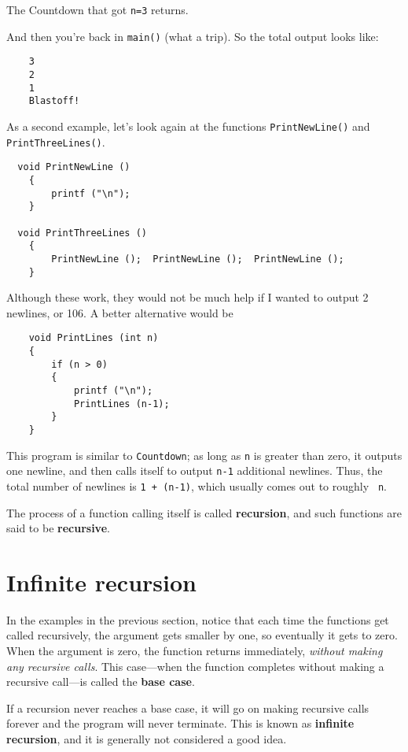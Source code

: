 The Countdown that got {\tt n=3} returns.

\noindent And then you're back in {\tt main()} (what a trip).  So the
total output looks like:

\begin{verbatim}
    3
    2
    1
    Blastoff!
\end{verbatim}
%
As a second example, let's look again at the functions
{\tt PrintNewLine()} and {\tt PrintThreeLines()}.

\begin{verbatim}
  void PrintNewLine () 
    {
        printf ("\n");
    }

  void PrintThreeLines () 
    {
        PrintNewLine ();  PrintNewLine ();  PrintNewLine ();
    }
\end{verbatim}
%
Although these work, they would not be much help if I wanted
to output 2 newlines, or 106.  A better alternative would be

\begin{verbatim}
    void PrintLines (int n) 
    {
        if (n > 0) 
        {
            printf ("\n");
            PrintLines (n-1);
        }
    }
\end{verbatim}
%
This program is similar to {\tt Countdown}; as long as {\tt n} is
greater than zero, it outputs one newline, and then calls itself to
output {\tt n-1} additional newlines.  Thus, the total number of
newlines is {\tt 1 + (n-1)}, which usually comes out to roughly {\tt
n}.


The process of a function calling itself is called {\bf recursion}, and
such functions are said to be {\bf recursive}.

\section {Infinite recursion}

In the examples in the previous section, notice that each time the
functions get called recursively, the argument gets smaller by one, so
eventually it gets to zero.  When the argument is zero, the function
returns immediately, {\em without making any recursive calls}.
This case---when the function completes without making a recursive
call---is called the {\bf base case}.

If a recursion never reaches a base case, it will go on making recursive
calls forever and the program will never terminate.  This is known as
{\bf infinite recursion}, and it is generally not considered a good
idea.

